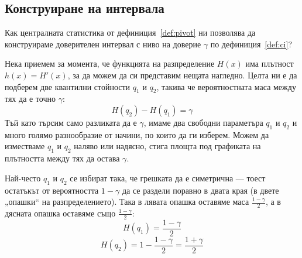 \subsection{Конструиране на интервала}
Как централната статистика от дефиниция~\ref{def:pivot} ни позволява да конструираме доверителен интервал с ниво на доверие $\gamma$ по дефиниция~\ref{def:ci}?

Нека приемем за момента, че функцията на разпределение $H(x)$ има плътност $h(x) = H'(x)$, за да можем да си представим нещата нагледно. Целта ни е да подберем две квантилни стойности $q_1$ и $q_2$, такива че вероятностната маса между тях да е точно $\gamma$:
\[
H(q_2) - H(q_1) = \gamma
\]
Тъй като търсим само разликата да е $\gamma$, имаме два свободни параметъра $q_1$ и $q_2$ и много голямо разнообразие от начини, по които да ги изберем. Можем да изместваме $q_1$ и $q_2$ наляво или надясно, стига площта под графиката на плътността между тях да остава $\gamma$.

Най-често $q_1$ и $q_2$ се избират така, че грешката да е симетрична — тоест остатъкът от вероятността $1 - \gamma$ да се раздели поравно в двата края (в двете „опашки“ на разпределението). Така в лявата опашка оставяме маса $\frac{1-\gamma}{2}$, а в дясната опашка оставяме също $\frac{1-\gamma}{2}$:
\[
H(q_1) = \frac{1-\gamma}{2}
\]
\[
H(q_2) = 1 - \frac{1-\gamma}{2} = \frac{1+\gamma}{2}
\]
\begin{lecfigure}[Симетричен избор на квантилите. Защрихованата площ между $q_1$ и $q_2$
е нивото на доверие $\gamma$; в двете опашки остава по $\frac{1-\gamma}{2}$. При
симетрично около нулата разпределение $q_1 = -q$ и $q_2 = q$.\label{fig:quantiles}]
\end{lecfigure}

